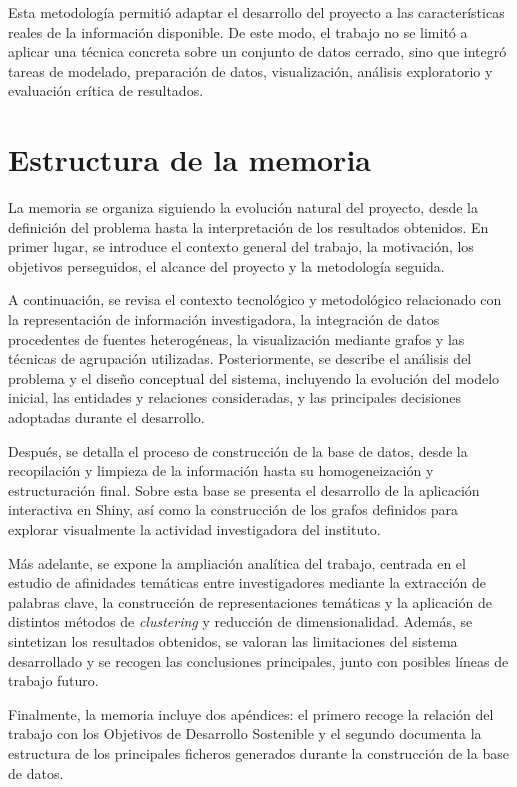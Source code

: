 \documentclass[11pt,spanish,listoffigures,listoftables]{tfgetsinf}
\begin{document}
Esta metodología permitió adaptar el desarrollo del proyecto a las características reales de la información disponible. De este modo, el trabajo no se limitó a aplicar una técnica concreta sobre un conjunto de datos cerrado, sino que integró tareas de modelado, preparación de datos, visualización, análisis exploratorio y evaluación crítica de resultados.

\section{Estructura de la memoria}

La memoria se organiza siguiendo la evolución natural del proyecto, desde la definición del problema hasta la interpretación de los resultados obtenidos. En primer lugar, se introduce el contexto general del trabajo, la motivación, los objetivos perseguidos, el alcance del proyecto y la metodología seguida.

A continuación, se revisa el contexto tecnológico y metodológico relacionado con la representación de información investigadora, la integración de datos procedentes de fuentes heterogéneas, la visualización mediante grafos y las técnicas de agrupación utilizadas. Posteriormente, se describe el análisis del problema y el diseño conceptual del sistema, incluyendo la evolución del modelo inicial, las entidades y relaciones consideradas, y las principales decisiones adoptadas durante el desarrollo.

Después, se detalla el proceso de construcción de la base de datos, desde la recopilación y limpieza de la información hasta su homogeneización y estructuración final. Sobre esta base se presenta el desarrollo de la aplicación interactiva en Shiny, así como la construcción de los grafos definidos para explorar visualmente la actividad investigadora del instituto.

Más adelante, se expone la ampliación analítica del trabajo, centrada en el estudio de afinidades temáticas entre investigadores mediante la extracción de palabras clave, la construcción de representaciones temáticas y la aplicación de distintos métodos de \textit{clustering} y reducción de dimensionalidad. Además, se sintetizan los resultados obtenidos, se valoran las limitaciones del sistema desarrollado y se recogen las conclusiones principales, junto con posibles líneas de trabajo futuro.

Finalmente, la memoria incluye dos apéndices: el primero recoge la relación del trabajo con los Objetivos de Desarrollo Sostenible y el segundo documenta la estructura de los principales ficheros generados durante la construcción de la base de datos.
\end{document}
